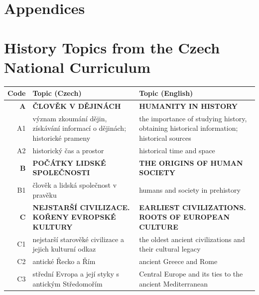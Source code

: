 \documentclass[]{interact}
\theoremstyle{plain}%
\theoremstyle{definition}
\theoremstyle{remark}
\begin{document}
\section{Appendices}

\appendix

\section{History Topics from the Czech National Curriculum}
\label{appendix:national-curriculum-topics}

\setcounter{table}{0}
\begin{table}
  {\begin{tabular}{r|p{10cm}|p{10cm}}

\textbf{Code} & \textbf{Topic (Czech)} & \textbf{Topic (English)} \\ \hline \hline
\textbf{A} & \textbf{ČLOVĚK V DĚJINÁCH} & \textbf{HUMANITY IN HISTORY} \\
A1 & význam zkoumání dějin, získávání informací o dějinách; historické prameny & the importance of studying history, obtaining historical information; historical sources \\ 
A2 & historický čas a prostor & historical time and space \\ \hline

\textbf{B} & \textbf{POČÁTKY LIDSKÉ SPOLEČNOSTI} & \textbf{THE ORIGINS OF HUMAN SOCIETY} \\ 
B1 & člověk a lidská společnost v pravěku & humans and society in prehistory \\ \hline

\textbf{C} & \textbf{NEJSTARŠÍ CIVILIZACE. KOŘENY EVROPSKÉ KULTURY} & \textbf{EARLIEST CIVILIZATIONS. ROOTS OF EUROPEAN CULTURE} \\ 
C1 & nejstarší starověké civilizace a jejich kulturní odkaz & the oldest ancient civilizations and their cultural legacy \\ 
C2 & antické Řecko a Řím & ancient Greece and Rome \\ 
C3 & střední Evropa a její styky s antickým Středomořím & Central Europe and its ties to the ancient Mediterranean \\ \hline


\end{tabular}}
\end{table}
\end{document}
